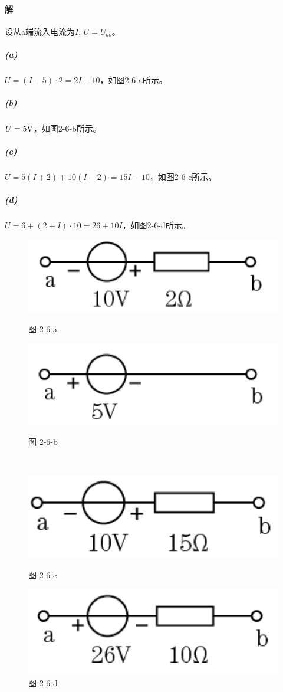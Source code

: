 \documentclass[hyperref, UTF8]{ctexart}
\begin{document}
\paragraph{解}设从a端流入电流为$I$, $U=U_{ab}$。
\subparagraph{(a)}
$U=(I-5)\cdot 2=2I-10$，如图2-6-a所示。
\subparagraph{(b)}
$U=5{\rm V}$，如图2-6-b所示。
\subparagraph{(c)}
$U=5(I+2)+10(I-2)=15I-10$，如图2-6-c所示。
\subparagraph{(d)}
$U=6+(2+I)\cdot 10=26+10I$，如图2-6-d所示。
\begin{figure}[!htb]
  \centering
  \begin{minipage}[t]{0.179\textwidth}
    \centering
    \includegraphics[width=1\textwidth]{p2-6-a-sol.png}
    \caption*{图 2-6-a}
  \end{minipage}
  \begin{minipage}[t]{0.177\textwidth}
    \centering
    \includegraphics[width=1\textwidth]{p2-6-b-sol.png}
    \caption*{图 2-6-b}
  \end{minipage} \\
  \centering
  \begin{minipage}[t]{0.165\textwidth}
    \centering
    \includegraphics[width=1\textwidth]{p2-6-c-sol.png}
    \caption*{图 2-6-c}
  \end{minipage}
  \begin{minipage}[t]{0.172\textwidth}
    \centering
    \includegraphics[width=1\textwidth]{p2-6-d-sol.png}
    \caption*{图 2-6-d}
  \end{minipage}
\end{figure}
\end{document}
